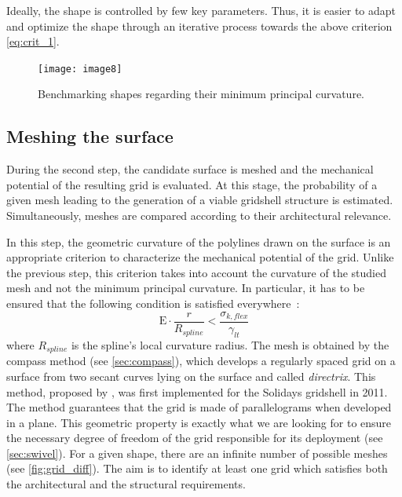 Ideally, the shape is controlled by few key parameters. Thus, it is easier to adapt and optimize the shape through an iterative process towards the above criterion \cref{eq:crit_1}.

\begin{figure}[t]
\centering
\texttt{[image: image8]}
\caption[Benchmarking shapes regarding their curvature]{Benchmarking shapes regarding their minimum principal curvature.}
\label{fig:shape_bench}
\end{figure}

\subsection{Meshing the surface}
During the second step, the candidate surface is meshed and the mechanical potential of the resulting grid is evaluated. At this stage, the probability of a given mesh leading to the generation of a viable gridshell structure is estimated. Simultaneously, meshes are compared according to their architectural relevance.

In this step, the geometric curvature of the polylines drawn on the surface is an appropriate criterion to characterize the mechanical potential of the grid. Unlike the previous step, this criterion takes into account the curvature of the studied mesh and not the minimum principal curvature. In particular, it has to be ensured that the following condition is satisfied everywhere~:
\begin{equation}
	\mathrm{E} \cdot   \frac{r}{R_{spline}}  <   \frac{\sigma_{k,flex}}{\gamma_{lt}}
	\label{eq:crit_2}
\end{equation}
where $R_{spline}$ is the spline’s local curvature radius. The mesh is obtained by the compass method (see \cref{sec:compass}), which develops a regularly spaced grid on a surface from two secant curves lying on the surface and called \emph{directrix}. This method, proposed by \cite{Otto1974}, was first implemented for the Solidays gridshell in 2011. The method guarantees that the grid is made of parallelograms when developed in a plane. This geometric property is exactly what we are looking for to ensure the necessary degree of freedom of the grid responsible for its deployment (see \cref{sec:swivel}). For a given shape, there are an infinite number of possible meshes (see \cref{fig:grid_diff}). The aim is to identify at least one grid which satisfies both the architectural and the structural requirements. 

